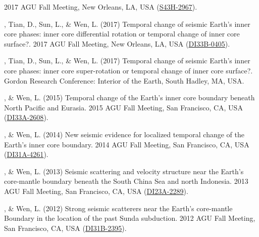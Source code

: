 \begin{etaremune}
    2017 AGU Fall Meeting, New Orleans, LA, USA (\href{http://adsabs.harvard.edu/abs/2017AGUFM.S43H2967Y}{S43H-2967}).
\item
    \Yao, Tian, D., Sun, L., \& Wen, L. (2017)
    Temporal change of seismic Earth's inner core phases: inner core differential rotation or temporal change of inner core surface?.
    2017 AGU Fall Meeting, New Orleans, LA, USA (\href{http://adsabs.harvard.edu/abs/2017AGUFMDI33B0405Y}{DI33B-0405}).
\item
    \Yao, Tian, D., Sun, L., \& Wen, L. (2017)
    Temporal change of seismic Earth's inner core phases: inner core super-rotation or temporal change of inner core surface?.
    Gordon Research Conference: Interior of the Earth, South Hadley, MA, USA.
\item
    \Yao, \& Wen, L. (2015)
    Temporal change of the Earth's inner core boundary beneath North Pacific and Eurasia.
    2015 AGU Fall Meeting, San Francisco, CA, USA (\href{http://adsabs.harvard.edu/abs/2015AGUFMDI33A2608Y}{DI33A-2608}).
\item
    \Yao, \& Wen, L. (2014)
    New seismic evidence for localized temporal change of the Earth's inner core boundary.
    2014 AGU Fall Meeting, San Francisco, CA, USA (\href{http://adsabs.harvard.edu/abs/2014AGUFMDI31A4261Y}{DI31A-4261}).
\item
    \Yao, \& Wen, L. (2013)
    Seismic scattering and velocity structure near the Earth's core-mantle boundary beneath the South China Sea and north Indonesia.
    2013 AGU Fall Meeting, San Francisco, CA, USA (\href{http://adsabs.harvard.edu/abs/2013AGUFMDI23A2289Y}{DI23A-2289}).
\item
    \Yao, \& Wen, L. (2012)
    Strong seismic scatterers near the Earth's core-mantle Boundary in the location of the past Sunda subduction.
    2012 AGU Fall Meeting, San Francisco, CA, USA (\href{http://adsabs.harvard.edu/abs/2012AGUFMDI31B2395Y}{DI31B-2395}).
\end{etaremune}

